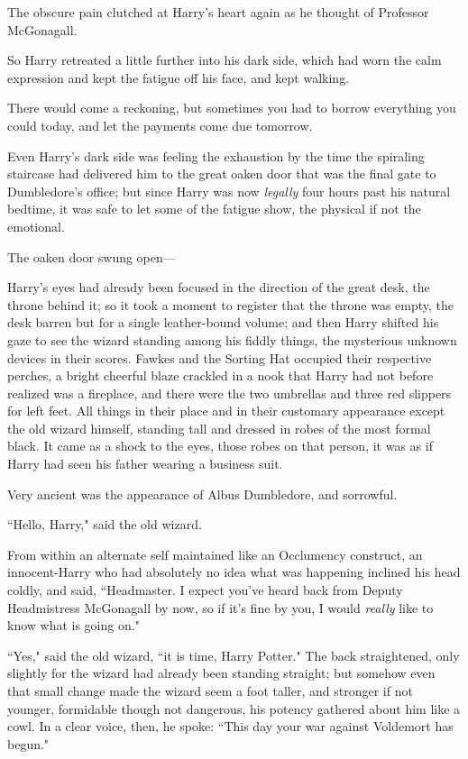 The obscure pain clutched at Harry's heart again as he thought of Professor McGonagall.

So Harry retreated a little further into his dark side, which had worn the calm expression and kept the fatigue off his face, and kept walking.

There would come a reckoning, but sometimes you had to borrow everything you could today, and let the payments come due tomorrow.

\later

Even Harry's dark side was feeling the exhaustion by the time the spiraling staircase had delivered him to the great oaken door that was the final gate to Dumbledore's office; but since Harry was now \emph{legally} four hours past his natural bedtime, it was safe to let some of the fatigue show, the physical if not the emotional.

The oaken door swung open—

Harry's eyes had already been focused in the direction of the great desk, the throne behind it; so it took a moment to register that the throne was empty, the desk barren but for a single leather-bound volume; and then Harry shifted his gaze to see the wizard standing among his fiddly things, the mysterious unknown devices in their scores. Fawkes and the Sorting Hat occupied their respective perches, a bright cheerful blaze crackled in a nook that Harry had not before realized was a fireplace, and there were the two umbrellas and three red slippers for left feet. All things in their place and in their customary appearance except the old wizard himself, standing tall and dressed in robes of the most formal black. It came as a shock to the eyes, those robes on that person, it was as if Harry had seen his father wearing a business suit.

Very ancient was the appearance of Albus Dumbledore, and sorrowful.

``Hello, Harry," said the old wizard.

From within an alternate self maintained like an Occlumency construct, an innocent-Harry who had absolutely no idea what was happening inclined his head coldly, and said, ``Headmaster. I expect you've heard back from Deputy Headmistress McGonagall by now, so if it's fine by you, I would \emph{really} like to know what is going on."

``Yes," said the old wizard, ``it is time, Harry Potter." The back straightened, only slightly for the wizard had already been standing straight; but somehow even that small change made the wizard seem a foot taller, and stronger if not younger, formidable though not dangerous, his potency gathered about him like a cowl. In a clear voice, then, he spoke: ``This day your war against Voldemort has begun."

